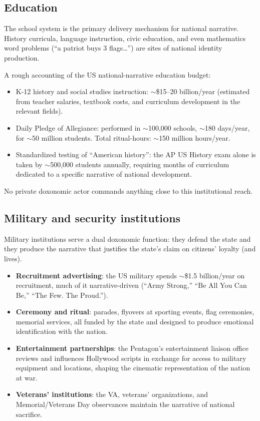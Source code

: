 \subsection{Education}

The school system is the primary delivery mechanism for national narrative.
History curricula, language instruction, civic education, and even mathematics word problems (``a patriot buys 3 flags\ldots'') are sites of national identity production.

\begin{example}
\label{ex:education-national}
A rough accounting of the US national-narrative education budget:
\begin{itemize}[nosep]
  \item K-12 history and social studies instruction: $\sim$\$15--20 billion/year (estimated from teacher salaries, textbook costs, and curriculum development in the relevant fields).
  \item Daily Pledge of Allegiance: performed in $\sim$100,000 schools, $\sim$180 days/year, for $\sim$50 million students. Total ritual-hours: $\sim$150 million hours/year.
  \item Standardized testing of ``American history'': the AP US History exam alone is taken by $\sim$500,000 students annually, requiring months of curriculum dedicated to a specific narrative of national development.
\end{itemize}
No private doxonomic actor commands anything close to this institutional reach.
\end{example}

\subsection{Military and security institutions}

Military institutions serve a dual doxonomic function: they defend the state and they produce the narrative that justifies the state's claim on citizens' loyalty (and lives).

\begin{itemize}[nosep]
  \item \textbf{Recruitment advertising}: the US military spends $\sim$\$1.5 billion/year on recruitment, much of it narrative-driven (``Army Strong,'' ``Be All You Can Be,'' ``The Few. The Proud.'').
  \item \textbf{Ceremony and ritual}: parades, flyovers at sporting events, flag ceremonies, memorial services, all funded by the state and designed to produce emotional identification with the nation.
  \item \textbf{Entertainment partnerships}: the Pentagon's entertainment liaison office reviews and influences Hollywood scripts in exchange for access to military equipment and locations, shaping the cinematic representation of the nation at war.
  \item \textbf{Veterans' institutions}: the VA, veterans' organizations, and Memorial/Veterans Day observances maintain the narrative of national sacrifice.
\end{itemize}

